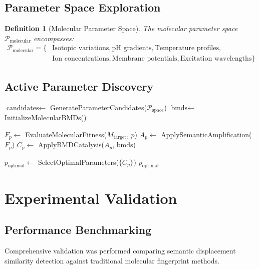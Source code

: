 \documentclass[12pt,a4paper]{article}
\newtheorem{definition}[theorem]{Definition}
\begin{document}
\subsection{Parameter Space Exploration}

\begin{definition}[Molecular Parameter Space]
The molecular parameter space $\mathcal{P}_{\text{molecular}}$ encompasses:
\begin{align}
\mathcal{P}_{\text{molecular}} = \{&\text{Isotopic variations}, \text{pH gradients}, \text{Temperature profiles}, \\
&\text{Ion concentrations}, \text{Membrane potentials}, \text{Excitation wavelengths}\}
\end{align}
\end{definition}

\subsection{Active Parameter Discovery}

\begin{algorithm}[H]
\caption{Active Molecular Parameter Discovery}
\begin{algorithmic}[1]
    \State $\text{candidates} \gets$ GenerateParameterCandidates($\mathcal{P}_{\text{space}}$)
    \State $\text{bmds} \gets$ InitializeMolecularBMDs()

        \State $F_p \gets$ EvaluateMolecularFitness($M_{\text{target}}$, $p$)
        \State $A_p \gets$ ApplySemanticAmplification($F_p$)
        \State $C_p \gets$ ApplyBMDCatalysis($A_p$, $\text{bmds}$)
    \EndFor

    \State $p_{\text{optimal}} \gets$ SelectOptimalParameters($\{C_p\}$)
    \State \Return $p_{\text{optimal}}$
\EndProcedure
\end{algorithmic}
\end{algorithm}

\section{Experimental Validation}

\subsection{Performance Benchmarking}

Comprehensive validation was performed comparing semantic displacement similarity detection against traditional molecular fingerprint methods.
\end{document}
